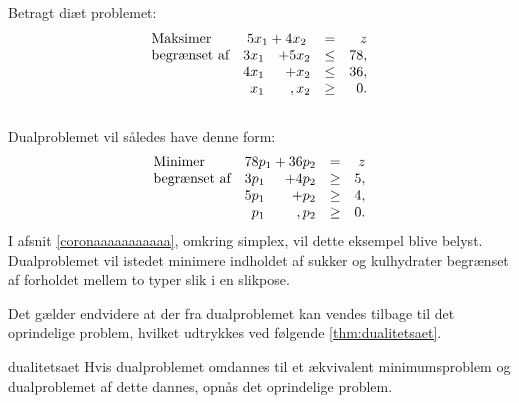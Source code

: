 %
\begin{eks}
\label{dual}
%
Betragt diæt problemet:
%
\begin{align*}
\begin{array}{lrrlr}
\text{Maksimer}		&	\multicolumn{2}{c}{5x_1+4x_2}  & = & z\\
\text{begrænset af}	&3x_1& +5x_2			&\leq 	&78,\\
					&4x_1& + x_2				&\leq	& 36,\\
					&x_1& , x_2				&\geq	& 0.
\end{array}
\end{align*}
\\
Dualproblemet vil således have denne form:
\begin{align*}
\begin{array}{lrrlr}
\text{Minimer}		&	\multicolumn{2}{c}{78p_1+36p_2}  & =  & z\\
\text{begrænset af}	&3p_1& +4p_2			&\geq 	&5,\\
					&5p_1& + p_2				&\geq	& 4,\\
					&p_1& , p_2				&\geq	& 0.
\end{array}
\end{align*}
% 
I afsnit \ref{coronaaaaaaaaaaa}, omkring simplex, vil dette eksempel blive belyst. Dualproblemet vil istedet minimere indholdet af sukker og kulhydrater begrænset af forholdet mellem to typer slik i en slikpose.
%
%
\end{eks}
%
%
Det gælder endvidere at der fra dualproblemet kan vendes tilbage til det oprindelige problem, hvilket udtrykkes ved følgende \ref{thm:dualitetsaet}.
%
\begin{thm}{}{dualitetsaet}
Hvis dualproblemet omdannes til et ækvivalent minimumsproblem og dualproblemet af dette dannes, opnås det oprindelige problem.
\end{thm}
